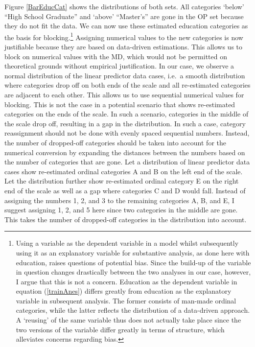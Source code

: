 \documentclass[12pt,econ]{sources/authesis}
\begin{document}
Figure \ref{BarEducCat} shows the distributions of both sets. All categories `below' ``High School Graduate'' and `above' ``Master's'' are gone in the OP set because they do not fit the data. We can now use these estimated education categories as the basis for blocking.\footnote{Using a variable as the dependent variable in a model whilst subsequently using it as an explanatory variable for substantive analysis, as done here with education, raises questions of potential bias. Since the build-up of the variable in question changes drastically between the two analyses in our case, however, I argue that this is not a concern. Education as the dependent variable in equation (\ref{trainAnes}) differs greatly from education as the explanatory variable in subsequent analysis. The former consists of man-made ordinal categories, while the latter reflects the distribution of a data-driven approach. A `reusing' of the same variable thus does not actually take place since the two versions of the variable differ greatly in terms of structure, which alleviates concerns regarding bias.} Assigning numerical values to the new categories is now justifiable because they are based on data-driven estimations. This allows us to block on numerical values with the MD, which would not be permitted on theoretical grounds without empirical justification. In our case, we observe a normal distribution of the linear predictor data cases, i.e.~a smooth distribution where categories drop off on both ends of the scale and all re-estimated categories are adjacent to each other. This allows us to use sequential numerical values for blocking. This is not the case in a potential scenario that shows re-estimated categories on the ends of the scale. In such a scenario, categories in the middle of the scale drop off, resulting in a gap in the distribution. In such a case, category reassignment should not be done with evenly spaced sequential numbers. Instead, the number of dropped-off categories should be taken into account for the numerical conversion by expanding the distances between the numbers based on the number of categories that are gone. Let a distribution of linear predictor data cases show re-estimated ordinal categories A and B on the left end of the scale. Let the distribution further show re-estimated ordinal category E on the right end of the scale as well as a gap where categories C and D would fall. Instead of assigning the numbers 1, 2, and 3 to the remaining categories A, B, and E, I suggest assigning 1, 2, and 5 here since two categories in the middle are gone. This takes the number of dropped-off categories in the distribution into account.
\end{document}
